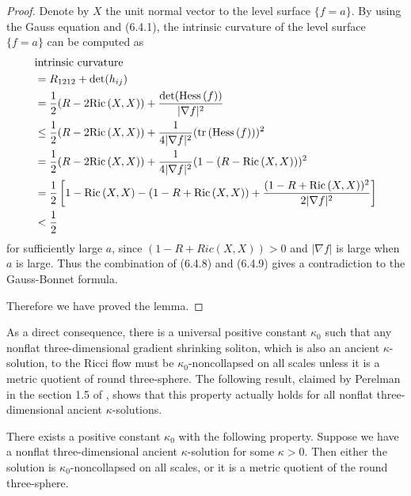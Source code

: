 \begin{proof}
Denote by $X$ the unit normal vector to the level surface
$\{f=a\}$. By using the Gauss equation and (6.4.1), the intrinsic
curvature of the level surface $\{f=a\}$ can be computed as
\begin{align}
&\text{intrinsic curvature} \\
&  = R_{1212}+\det(h_{ij})  \nonumber\\
&  = \frac{1}{2}(R-2{\rm Ric}\,(X,X))
+\frac{\det({\rm Hess}\,(f))}{|\nabla f|^2} \nonumber\\
&  \le \frac{1}{2}(R-2{\rm Ric}\,(X,X))
+\frac{1}{4|\nabla f|^2}(\operatorname{tr}\,({\rm Hess}\,(f)))^2 \nonumber\\
&  = \frac{1}{2}(R-2{\rm Ric}\,(X,X))
+\frac{1}{4|\nabla f|^2}(1-(R-{\rm Ric}\,(X,X)))^2 \nonumber\\
& =\frac{1}{2}\left[1-{\rm Ric}\,(X,X)-(1-R+{\rm Ric}\,(X,X))
+\frac{(1-R+{\rm Ric}\,(X,X))^2}{2|\nabla f|^2}\right] \nonumber\\
&  < \frac{1}{2} \nonumber
\end{align} %
for sufficiently large $a$, since $(1-R+Ric(X,X))>0$ and $|\nabla
f|$ is large when $a$ is large. Thus the combination of (6.4.8)
and (6.4.9) gives a contradiction to the Gauss-Bonnet formula.

Therefore we have proved the lemma.
\end{proof}

As a direct consequence, there is a universal positive constant
$\kappa_0$ such that any nonflat three-dimensional gradient
shrinking soliton, which is also an ancient $\kappa$-solution, to
the Ricci flow must be $\kappa_0$-noncollapsed on all scales
unless it is a metric quotient of  round three-sphere. The
following result, claimed by Perelman in the section 1.5 of
\cite{P2}, shows that this property actually holds for all nonflat
three-dimensional ancient $\kappa$-solutions.

\begin{proposition}
  \label{prop:cz-ancient-three-dimensional-universal-noncollapsing}
 There exists a positive constant $\kappa_0$ with
the following property. Suppose we have a nonflat
three-dimensional ancient $\kappa$-solution for some $\kappa >0$.
Then either the solution is $\kappa_0$-noncollapsed on all scales,
or it is a metric quotient of the round three-sphere.
\end{proposition}

